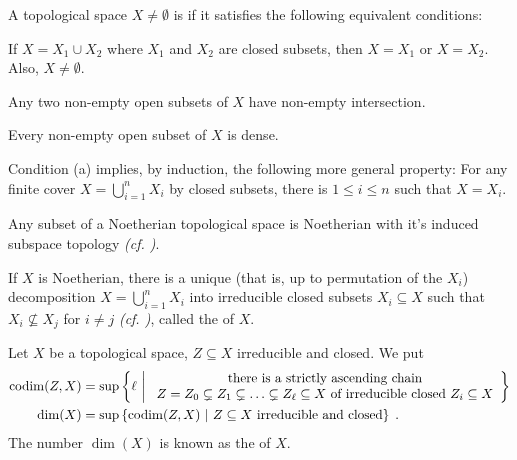 \documentclass[a4paper,parskip=half,numbers=enddot, DIV=12]{scrreprt}
\begin{document}
\begin{defi}
	A topological space $X\not=\emptyset$ is  if it satisfies the following equivalent conditions:
	\begin{alphanumerate}
		\item If $X = X_1\cup X_2$ where $X_1$ and $X_2$ are closed subsets, then $X=X_1$ or $X=X_2$. Also, $X\neq\emptyset$.
		\item Any two non-empty open subsets of $X$ have non-empty intersection.
		\item Every non-empty open subset of $X$ is dense.
	\end{alphanumerate}
\end{defi}
Condition (a) implies, by induction, the following more general property: 
For any finite cover $X= \bigcup_{i=1}^n X_i$ by closed subsets, there is $1\leq i\leq n$ such that $X=X_i$.
\begin{prop}
	\begin{alphanumerate}
		\item 
		Any subset of a Noetherian topological space is Noetherian with it's induced subspace topology \emph{(cf. \cite[Remark~2.2.1]{alg1})}. 
		\item 
		If $X$ is Noetherian, there is a unique (that is, up to permutation of the $X_i$) decomposition $X = \bigcup_{i=1}^n X_i$ into irreducible closed subsets $X_i\subseteq X$ such that $X_i\not\subseteq X_j$ for $i\neq j$ \emph{(cf. \cite[Proposition~2.1.1]{alg1})}, called the  of $X$.
	\end{alphanumerate}
	
\end{prop}
\begin{defi}
	Let $X$ be a topological space, $Z\subseteq X$ irreducible and closed. We put 
	\begin{align*}
	\operatorname{codim}(Z,X) &= \sup\left\{\ell\ \middle|\  
	\begin{array}{c}
	\text{there is a strictly ascending chain}\\
	Z=Z_0 \subsetneq Z_1\subsetneq \ldots \subsetneq Z_\ell\subseteq X\text{ of irreducible closed }Z_i\subseteq X
	\end{array}\right\}\\
	\dim(X) &= \sup\left\{\operatorname{codim}(Z,X)\ \middle|\  Z\subseteq X \text{ irreducible and closed}\right\}\;.
	\end{align*}
	The number $\dim(X)$ is known as the  of $X$.
\end{defi}
\end{document}
